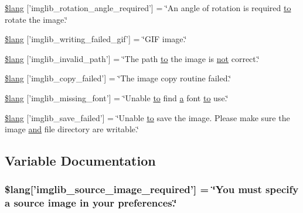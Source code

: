 \begin{DoxyCompactItemize}
\hyperlink{imglib__lang_8php_a1110d59ea8fd0564e78068dbda3438fb}{\$lang} \mbox{[}'imglib\-\_\-rotation\-\_\-angle\-\_\-required'\mbox{]} = \char`\"{}An angle of rotation is required \hyperlink{mathquill_8js_ae3622f38202b3532cd6eae25726945f8}{to} rotate the image.\char`\"{}
\item 
\hyperlink{imglib__lang_8php_a6169e9ed18d970dcc8965c4f195ae3e7}{\$lang} \mbox{[}'imglib\-\_\-writing\-\_\-failed\-\_\-gif'\mbox{]} = \char`\"{}G\-I\-F image.\char`\"{}
\item 
\hyperlink{imglib__lang_8php_a8ff486c25806a4731d1ffe20431df825}{\$lang} \mbox{[}'imglib\-\_\-invalid\-\_\-path'\mbox{]} = \char`\"{}The path \hyperlink{mathquill_8js_ae3622f38202b3532cd6eae25726945f8}{to} the image is \hyperlink{mathquill_8js_ac1e1ab538c27d68cc2cbafea74e7412c}{not} correct.\char`\"{}
\item 
\hyperlink{imglib__lang_8php_a9363000d2005b8276b39d581a11b562d}{\$lang} \mbox{[}'imglib\-\_\-copy\-\_\-failed'\mbox{]} = \char`\"{}The image copy routine failed.\char`\"{}
\item 
\hyperlink{imglib__lang_8php_a935800aad2be18ca4fe99bb074674848}{\$lang} \mbox{[}'imglib\-\_\-missing\-\_\-font'\mbox{]} = \char`\"{}Unable \hyperlink{mathquill_8js_ae3622f38202b3532cd6eae25726945f8}{to} find \hyperlink{bootstrap_8min_8js_a7318f59fb86a4437995ee89c780c51ac}{a} font \hyperlink{mathquill_8js_ae3622f38202b3532cd6eae25726945f8}{to} use.\char`\"{}
\item 
\hyperlink{imglib__lang_8php_a4d7a99fddc60c97a7327fa0125dea264}{\$lang} \mbox{[}'imglib\-\_\-save\-\_\-failed'\mbox{]} = \char`\"{}Unable \hyperlink{mathquill_8js_ae3622f38202b3532cd6eae25726945f8}{to} save the image. Please make sure the image \hyperlink{mathquill_8js_ac39c488ee3bd6d675c340966d33495a7}{and} file directory are writable.\char`\"{}
\end{DoxyCompactItemize}


\subsection{Variable Documentation}
\hypertarget{imglib__lang_8php_af48787ab142f633036ebdf1cc5da7409}{
\subsubsection[{\$lang}]{\setlength{\rightskip}{0pt plus 5cm}\$lang\mbox{[}'imglib\-\_\-source\-\_\-image\-\_\-required'\mbox{]} = \char`\"{}You must specify {\bf a} source image in your preferences.\char`\"{}}}\label{imglib__lang_8php_af48787ab142f633036ebdf1cc5da7409}



